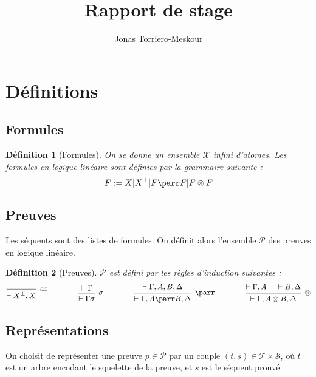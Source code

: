 \documentclass[11pt,a4paper]{article}
\title{Rapport de stage}
\author{Jonas Torriero-Meskour}
\newtheorem{definition}{Définition}
\newcommand*{\orth}{^\perp}
\newcommand*{\tensor}{\otimes}
\newcommand*{\hypv}[1]{\hypo{\vdash #1}}
\newcommand*{\axv}[1]{\infer{0}[\ensuremath{\mathit{ax}}]{\vdash #1}}
\newcommand*{\tensorv}[1]{\infer{2}[\ensuremath{\tensor}]{\vdash #1}}
\newcommand*{\parrv}[1]{\infer{1}[\ensuremath{\parr}]{\vdash #1}}
\newcommand*{\permv}[1]{\infer{1}[\ensuremath{\sigma}]{\vdash #1}}
\newcommand*{\proofs}{\ensuremath{\mathcal{P}}}
\newcommand*{\sequents}{\ensuremath{\mathcal{S}}}
\newcommand*{\trees}{\ensuremath{\mathcal{T}}}
\newcommand*{\representationslarge}{\ensuremath{\trees \times \sequents}}
\begin{document}
\maketitle

\section{Définitions}

\subsection{Formules}
\begin{definition}[Formules]
On se donne un ensemble $\mathcal{X}$ infini d'atomes. Les formules en logique linéaire sont définies par la grammaire suivante :
\begin{equation*}
F := X | X\orth | F \parr F | F \tensor F
\end{equation*}
\end{definition}

\subsection{Preuves}
Les séquents sont des listes de formules. On définit alors l'ensemble \proofs{} des preuves en logique linéaire.
\begin{definition}[Preuves]
\proofs{} est défini par les règles d'induction suivantes :
\begin{equation*}
\begin{prooftree}
  \axv{X\orth, X}
\end{prooftree}
\qquad\qquad
\begin{prooftree}
  \hypv{\Gamma}
  \permv{\Gamma{\sigma}}
\end{prooftree}
\qquad\qquad
\begin{prooftree}
  \hypv{\Gamma, A, B, \Delta}
  \parrv{\Gamma, A \parr B, \Delta}
\end{prooftree}
\qquad\qquad
\begin{prooftree}
  \hypv{\Gamma, A}
  \hypv{B, \Delta}
  \tensorv{\Gamma, A \tensor B, \Delta}
\end{prooftree}
\end{equation*}
\end{definition}

\subsection{Représentations}
On choisit de représenter une preuve $p \in \mathcal{P}$ par un couple $(t, s) \in \representationslarge$, où $t$ est un arbre encodant le squelette de la preuve, et $s$ est le séquent prouvé.
\end{document}
